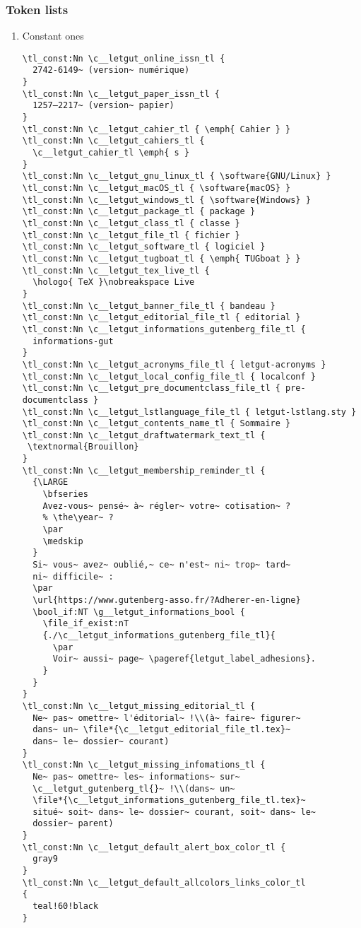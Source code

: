 \documentclass{letgut}
\begin{document}
\subsubsection{Token lists}
\label{ImplementationDeclarationsTokenlists-grbg55h0jlj0}
\begin{enumerate}
\item Constant ones
\label{ImplementationDeclarationsTokenlistsConstantones-obcg55h0jlj0}
\begin{lstlisting}
\tl_const:Nn \c__letgut_online_issn_tl {
  2742-6149~ (version~ numérique)
}
\tl_const:Nn \c__letgut_paper_issn_tl {
  1257–2217~ (version~ papier)
}
\tl_const:Nn \c__letgut_cahier_tl { \emph{ Cahier } }
\tl_const:Nn \c__letgut_cahiers_tl {
  \c__letgut_cahier_tl \emph{ s }
}
\tl_const:Nn \c__letgut_gnu_linux_tl { \software{GNU/Linux} }
\tl_const:Nn \c__letgut_macOS_tl { \software{macOS} }
\tl_const:Nn \c__letgut_windows_tl { \software{Windows} }
\tl_const:Nn \c__letgut_package_tl { package }
\tl_const:Nn \c__letgut_class_tl { classe }
\tl_const:Nn \c__letgut_file_tl { fichier }
\tl_const:Nn \c__letgut_software_tl { logiciel }
\tl_const:Nn \c__letgut_tugboat_tl { \emph{ TUGboat } }
\tl_const:Nn \c__letgut_tex_live_tl {
  \hologo{ TeX }\nobreakspace Live
}
\tl_const:Nn \c__letgut_banner_file_tl { bandeau }
\tl_const:Nn \c__letgut_editorial_file_tl { editorial }
\tl_const:Nn \c__letgut_informations_gutenberg_file_tl {
  informations-gut
}
\tl_const:Nn \c__letgut_acronyms_file_tl { letgut-acronyms }
\tl_const:Nn \c__letgut_local_config_file_tl { localconf }
\tl_const:Nn \c__letgut_pre_documentclass_file_tl { pre-documentclass }
\tl_const:Nn \c__letgut_lstlanguage_file_tl { letgut-lstlang.sty }
\tl_const:Nn \c__letgut_contents_name_tl { Sommaire }
\tl_const:Nn \c__letgut_draftwatermark_text_tl {
 \textnormal{Brouillon}
}
\tl_const:Nn \c__letgut_membership_reminder_tl {
  {\LARGE
    \bfseries
    Avez-vous~ pensé~ à~ régler~ votre~ cotisation~ ?
    % \the\year~ ?
    \par
    \medskip
  }
  Si~ vous~ avez~ oublié,~ ce~ n'est~ ni~ trop~ tard~
  ni~ difficile~ :
  \par
  \url{https://www.gutenberg-asso.fr/?Adherer-en-ligne}
  \bool_if:NT \g__letgut_informations_bool {
    \file_if_exist:nT
    {./\c__letgut_informations_gutenberg_file_tl}{
      \par
      Voir~ aussi~ page~ \pageref{letgut_label_adhesions}.
    }
  }
}
\tl_const:Nn \c__letgut_missing_editorial_tl {
  Ne~ pas~ omettre~ l'éditorial~ !\\(à~ faire~ figurer~
  dans~ un~ \file*{\c__letgut_editorial_file_tl.tex}~
  dans~ le~ dossier~ courant)
}
\tl_const:Nn \c__letgut_missing_infomations_tl {
  Ne~ pas~ omettre~ les~ informations~ sur~
  \c__letgut_gutenberg_tl{}~ !\\(dans~ un~
  \file*{\c__letgut_informations_gutenberg_file_tl.tex}~
  situé~ soit~ dans~ le~ dossier~ courant, soit~ dans~ le~
  dossier~ parent)
}
\tl_const:Nn \c__letgut_default_alert_box_color_tl {
  gray9
}
\tl_const:Nn \c__letgut_default_allcolors_links_color_tl
{
  teal!60!black
}
\end{lstlisting}


\end{enumerate}
\end{document}
